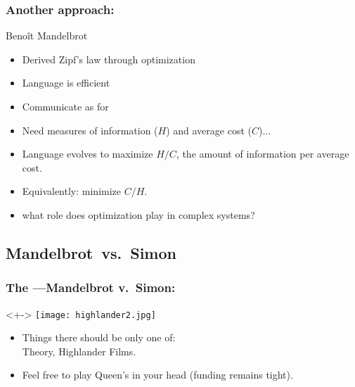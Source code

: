 \begin{frame}
  \frametitle{Another approach:}

  \begin{block}{Beno\^{i}t Mandelbrot}
    \begin{itemize}
    \item<1-> 
      Derived Zipf's law through optimization\cite{mandelbrot1953a}
    \item<2-> 
       Language is efficient
    \item<3-> 
      Communicate as 
      for 
    \item<4-> 
      Need measures of information ($H$) and average cost ($C$)...
    \item<5-> 
      Language evolves to maximize $H/C$,
      the amount of information per average cost.
    \item<6-> 
      Equivalently: minimize $C/H$.
    \item<7-> 
       what role does optimization play in complex systems?
    \end{itemize}
  \end{block}

\end{frame}

\subsection{Mandelbrot\ vs.\ Simon}

\begin{frame}
  \frametitle{The ---Mandelbrot v.\ Simon:}

  \begin{block}<+->{}
    \texttt{[image: highlander2.jpg]}
    \begin{itemize}
    \item<+->
      Things there should be only one of:\\ 
      Theory, Highlander Films.
    \item<+->
      Feel free to play Queen's 
      in your head
      (funding remains tight).
    \end{itemize}
  \end{block}
\end{frame}

